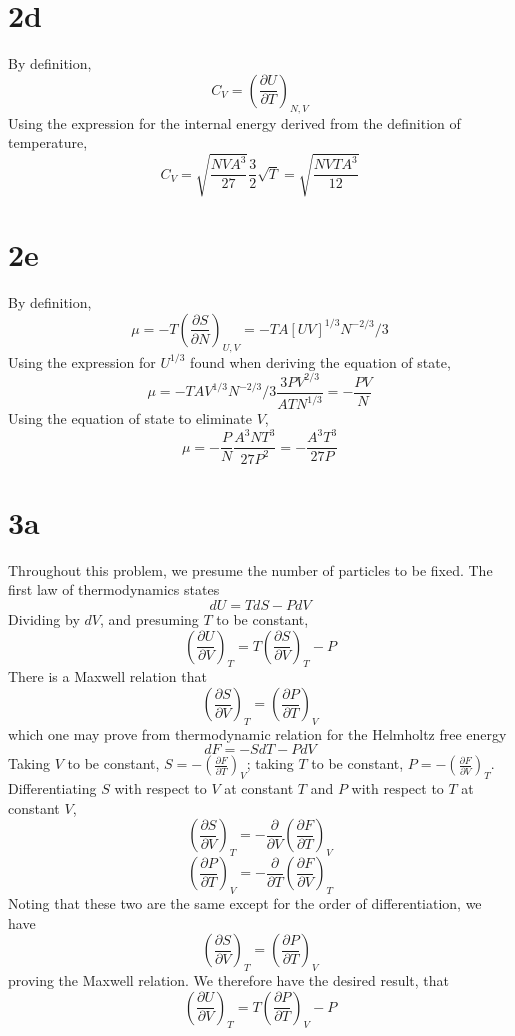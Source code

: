\documentclass{article}
\begin{document}
\section*{2d}
By definition,
\[C_{V}=\left( \frac{\partial U}{\partial T}\right)_{N,V}\]
Using the expression for the internal energy derived from the definition of temperature,
\[C_{V}=\sqrt{\frac{NVA^{3}}{27}}\frac{3}{2}\sqrt{T}=\sqrt{\frac{NVTA^{3}}{12}}\]

\section*{2e}
By definition,
\[\mu=-T\left(  \frac{\partial S}{\partial N}\right)_{U,V}=-TA[UV]^{1/3}N^{-2/3}/3\]
Using the expression for $U^{1/3}$ found when deriving the equation of state,
\[\mu=-TAV^{1/3}N ^{-2/3}/3\frac{3PV^{2/3}}{ATN^{1/3}}=-\frac{PV}{N}\]
Using the equation of state to eliminate $V$,
\[\mu=-\frac{P}{N}\frac{A^{3}NT^{3}}{27P^{2}}=-\frac{A^{3}T^{3}}{27P}\]

\section*{3a}
Throughout this problem, we presume the number of particles to be fixed.
The first law of thermodynamics states
\[dU=TdS-PdV\]
Dividing by $dV$, and presuming $T$ to be constant,
\[\left( \frac{\partial U}{\partial V}\right)_{T}=T\left( \frac{\partial S}{\partial V}\right)_{T}-P\]
There is a Maxwell relation that
\[\left( \frac{\partial S}{\partial V} \right)_{T}=\left( \frac{\partial P}{\partial T} \right)_{V}\]
which one may prove from thermodynamic relation for the Helmholtz free energy
\[dF=-SdT-PdV\]
Taking $V$ to be constant, $S=-\left(\frac{\partial F}{\partial T} \right)_{V}$;
taking $T$ to be constant, $P=-\left( \frac{\partial F}{\partial V} \right)_{T}$.
Differentiating $S$ with respect to $V$ at constant $T$ and $P$ with respect to $T$ at constant $V$,
\[\left( \frac{\partial S}{\partial V}\right)_{T}=-\frac{\partial}{\partial V}\left( \frac{\partial F}{\partial T} \right)_{V}\]
\[\left( \frac{\partial P}{\partial T}\right)_{V}=-\frac{\partial}{\partial T}\left( \frac{\partial F}{\partial V} \right)_{T}\]
Noting that these two are the same except for the order of differentiation, we have
\[\left( \frac{\partial S}{\partial V} \right)_{T}=\left( \frac{\partial P}{\partial T} \right)_{V}\]
proving the Maxwell relation.
We therefore have the desired result, that
\[\left( \frac{\partial U}{\partial V} \right)_{T}=T\left( \frac{\partial P}{\partial T} \right)_{V}-P\]
\end{document}
